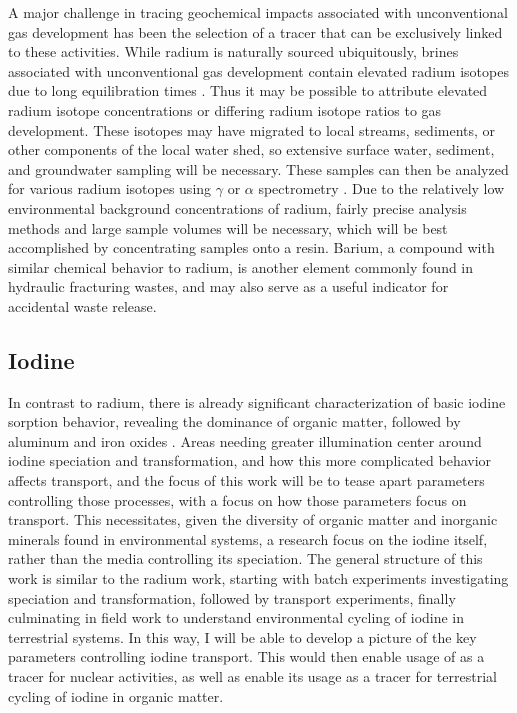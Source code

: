 \documentclass[twoside,12pt,titlepage]{article}
\newcommand{\isotope}[2]{\ch{^{#1}#2}}
\begin{document}
\par A major challenge in tracing geochemical impacts associated with unconventional gas development has been the selection of a tracer that can be exclusively linked to these activities. While radium is naturally sourced ubiquitously, brines associated with unconventional gas development contain elevated radium isotopes due to long equilibration times \cite{Barbot2013}. Thus it may be possible to attribute elevated radium isotope concentrations or differing radium isotope ratios to gas development. These isotopes may have migrated to local streams, sediments, or other components of the local water shed, so extensive surface water, sediment, and groundwater sampling will be necessary. These samples can then be analyzed for various radium isotopes using $\gamma$ or $\alpha$ spectrometry \cite{Elsinger1982,Bojanowski2005}. Due to the relatively low environmental background concentrations of radium, fairly precise analysis methods and large sample volumes will be necessary, which will be best accomplished by concentrating samples onto a resin. Barium, a compound with similar chemical behavior to radium, is another element commonly found in hydraulic fracturing wastes, and may also serve as a useful indicator for accidental waste release.

\subsection{Iodine}

In contrast to radium, there is already significant characterization of basic iodine sorption behavior, revealing the dominance of organic matter, followed by aluminum and iron oxides \cite{Kaplan2014}. Areas needing greater illumination center around iodine speciation and transformation, and how this more complicated behavior affects transport, and the focus of this work will be to tease apart parameters controlling those processes, with a focus on how those parameters focus on transport. This necessitates, given the diversity of organic matter and inorganic minerals found in environmental systems, a research focus on the iodine itself, rather than the media controlling its speciation. The general structure of this work is similar to the radium work, starting with batch experiments investigating speciation and transformation, followed by transport experiments, finally culminating in field work to understand environmental cycling of iodine in terrestrial systems. In this way, I will be able to develop a picture of the key parameters controlling iodine transport. This would then enable usage of \isotope{129}{I} as a tracer for nuclear activities, as well as enable its usage as a tracer for terrestrial cycling of iodine in organic matter.
\end{document}
